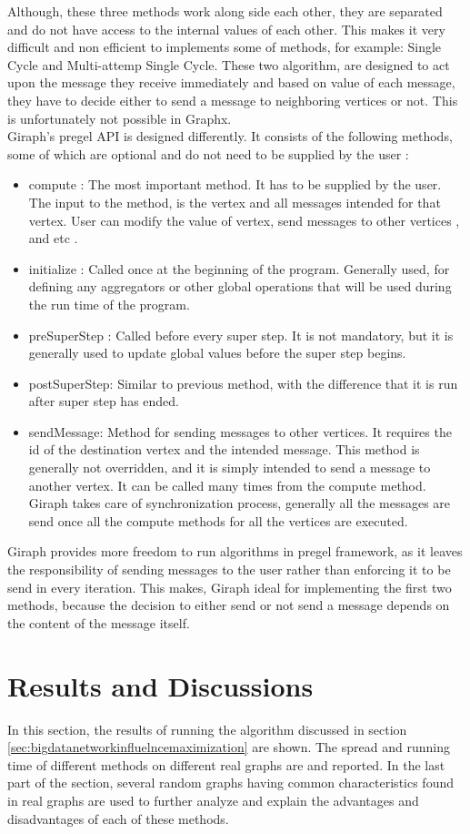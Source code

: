 \documentclass[english]{tktltiki}
\begin{document}
Although, these three methods work along side each other, they are separated and do not have access to the internal values of each other. This makes it very difficult and non efficient to implements some of methods, for example: Single Cycle and Multi-attemp Single Cycle. These two algorithm, are designed to act upon the message they receive immediately and based on value of each message, they have to decide either to send a message to neighboring vertices or not. This is unfortunately not possible in Graphx. \\
Giraph's pregel API is designed differently. It consists of the following methods, some of which are optional and do not need to be supplied by the user :
\begin{itemize}
\item compute : The most important method. It has to be supplied by the user. The input to the method, is the vertex and all messages intended for that vertex. User can modify the value of vertex, send messages to other vertices , and etc .
\item initialize : Called once at the beginning of the program. Generally used, for defining any aggregators or other global operations that will be used during the run time of the program.
\item preSuperStep : Called before every super step. It is not mandatory, but it is generally used to update global values before the super step begins.
\item postSuperStep: Similar to previous method, with the difference that it is run after super step has ended.
\item sendMessage: Method for sending messages to other vertices. It requires the id of the destination vertex and the intended message. This method is generally not overridden, and it is simply intended to send a message to another vertex. It can be called many times from the compute method. Giraph takes care of synchronization process, generally all the messages are send once all the compute methods for all the vertices are executed.
\end{itemize}

Giraph provides more freedom to run algorithms in pregel framework, as it leaves the responsibility of sending messages to the user rather than enforcing it to be send in every iteration. This makes, Giraph ideal for implementing the first two methods, because the decision to either send or not send a message depends on the content of the message itself.


\section{Results and Discussions}
\label{sec:resanddis}
In this section, the results of running the algorithm discussed in section \ref{sec:bigdatanetworkinfluelncemaximization} are shown. The spread and running time of different methods on different real graphs are and reported. In the last part of the section, several random graphs having common characteristics found in real graphs are used to further analyze and explain the advantages and disadvantages of each of these methods.
\end{document}
